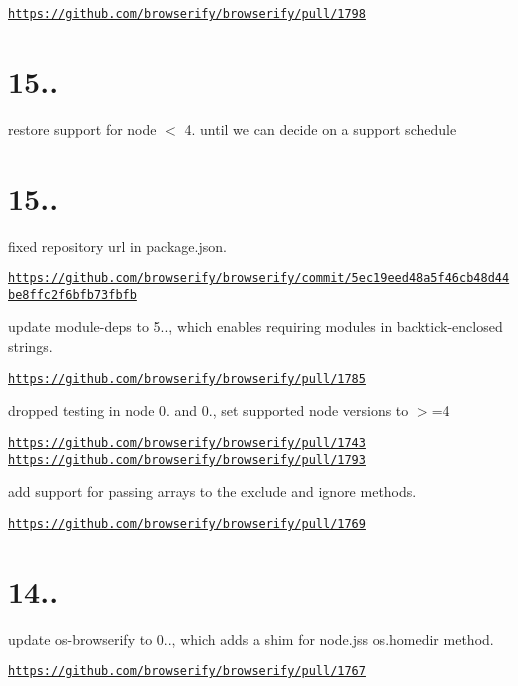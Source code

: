 \href{https://github.com/browserify/browserify/pull/1798}{\tt https\+://github.\+com/browserify/browserify/pull/1798}

\section*{15..}

restore support for node {\ttfamily $<$ 4.} until we can decide on a support schedule

\section*{15..}

fixed repository url in package.\+json.

\href{https://github.com/browserify/browserify/commit/5ec19eed48a5f46cb48d44be8ffc2f6bfb73fbfb}{\tt https\+://github.\+com/browserify/browserify/commit/5ec19eed48a5f46cb48d44be8ffc2f6bfb73fbfb}

update {\ttfamily module-\/deps} to 5.., which enables requiring modules in backtick-\/enclosed strings.

\href{https://github.com/browserify/browserify/pull/1785}{\tt https\+://github.\+com/browserify/browserify/pull/1785}

dropped testing in node 0. and 0., set supported node versions to {\ttfamily $>$=4}

\href{https://github.com/browserify/browserify/pull/1743}{\tt https\+://github.\+com/browserify/browserify/pull/1743} \href{https://github.com/browserify/browserify/pull/1793}{\tt https\+://github.\+com/browserify/browserify/pull/1793}

add support for passing arrays to the {\ttfamily exclude} and {\ttfamily ignore} methods.

\href{https://github.com/browserify/browserify/pull/1769}{\tt https\+://github.\+com/browserify/browserify/pull/1769}

\section*{14..}

update {\ttfamily os-\/browserify} to 0.., which adds a shim for node.\+js\textquotesingle{}s {\ttfamily os.\+homedir} method.

\href{https://github.com/browserify/browserify/pull/1767}{\tt https\+://github.\+com/browserify/browserify/pull/1767}

